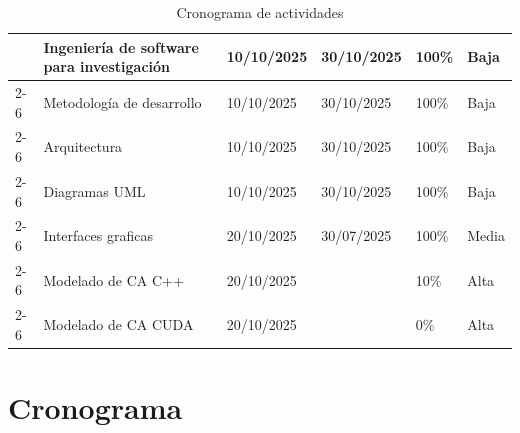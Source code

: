 \documentclass[letterpaper,10pt,oneside]{article}
\begin{document}
\begin{table}[htbp]
\begin{tabular}{|p{}|p{}|p{}|p{}|p{}|p{}|}
		& Ingeniería de software para investigación & 10/10/2025 & 30/10/2025 & 100\% & Baja \\  \cline{2-6}
		
		& Metodología de desarrollo & 10/10/2025 & 30/10/2025 & 100\% & Baja \\  \cline{2-6}
		
		& Arquitectura & 10/10/2025 & 30/10/2025 & 100\% & Baja \\  \cline{2-6}
		
		& Diagramas UML & 10/10/2025 & 30/10/2025 & 100\% & Baja \\  \cline{2-6} \hline
		
		\multirow{3}{0.15\textwidth}{\parbox{0.15\textwidth}{\centering Diseño}} 
		
		& Interfaces graficas & 20/10/2025 & 30/07/2025 & 100\% & Media \\  \cline{2-6}
		
		& Modelado de CA C++ & 20/10/2025 &  & 10\% & Alta \\  \cline{2-6}
		
		& Modelado de CA CUDA & 20/10/2025 &  & 0\% & Alta \\  \hline
	
		
		
	\end{tabular}
	\caption{Cronograma de actividades}
\end{table}


	
	
	
	\section{Cronograma}
	
\end{document}
